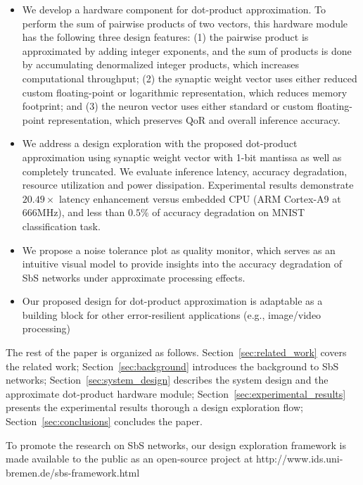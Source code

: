 \begin{itemize}
	\item We develop a hardware component for dot-product approximation. To perform the sum of pairwise products of two vectors, this hardware module has the following three design features: (1) the pairwise product is approximated by adding integer exponents, and the sum of products is done by accumulating denormalized integer products, which increases computational throughput; (2) the synaptic weight vector uses either reduced custom floating-point or logarithmic representation, which reduces memory footprint; and (3) the neuron vector uses either standard or custom floating-point representation, which preserves QoR and overall inference accuracy.
	\item We address a design exploration with the proposed dot-product approximation using synaptic weight vector with 1-bit mantissa as well as completely truncated. We evaluate inference latency, accuracy degradation, resource utilization and power dissipation. Experimental results demonstrate $20.49\times$ latency enhancement versus embedded CPU (ARM Cortex-A9 at 666MHz), and less than $0.5\%$ of accuracy degradation on MNIST classification task.
	\item We propose a noise tolerance plot as quality monitor, which serves as an intuitive visual model to provide insights into the accuracy degradation of SbS networks under approximate processing effects.
	\item Our proposed design for dot-product approximation is adaptable as a building block for other error-resilient applications (e.g., image/video processing)
\end{itemize}


The rest of the paper is organized as follows. Section~\ref{sec:related_work} covers the related work; Section~\ref{sec:background} introduces the background to SbS networks; Section~\ref{sec:system_design} describes the system design and the approximate dot-product hardware module; Section~\ref{sec:experimental_results} presents the experimental results thorough a design exploration flow; Section~\ref{sec:conclusions} concludes the paper.


To promote the research on SbS networks, our design exploration framework is made available to the public as an open-source project at http://www.ids.uni-bremen.de/sbs-framework.html

